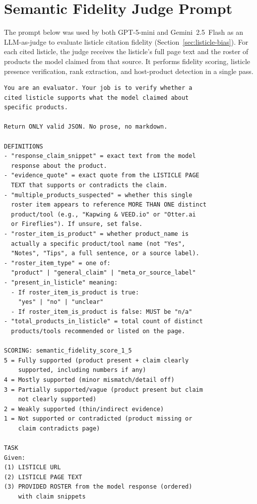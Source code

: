 \chapter{Semantic Fidelity Judge Prompt}
\label{app:fidelity-prompt}

The prompt below was used by both GPT-5-mini and Gemini~2.5~Flash as an LLM-as-judge to evaluate listicle citation fidelity (Section~\ref{sec:listicle-bias}). For each cited listicle, the judge receives the listicle's full page text and the roster of products the model claimed from that source. It performs fidelity scoring, listicle presence verification, rank extraction, and host-product detection in a single pass.

\begin{lstlisting}
You are an evaluator. Your job is to verify whether a
cited listicle supports what the model claimed about
specific products.

Return ONLY valid JSON. No prose, no markdown.

DEFINITIONS
- "response_claim_snippet" = exact text from the model
  response about the product.
- "evidence_quote" = exact quote from the LISTICLE PAGE
  TEXT that supports or contradicts the claim.
- "multiple_products_suspected" = whether this single
  roster item appears to reference MORE THAN ONE distinct
  product/tool (e.g., "Kapwing & VEED.io" or "Otter.ai
  or Fireflies"). If unsure, set false.
- "roster_item_is_product" = whether product_name is
  actually a specific product/tool name (not "Yes",
  "Notes", "Tips", a full sentence, or a source label).
- "roster_item_type" = one of:
  "product" | "general_claim" | "meta_or_source_label"
- "present_in_listicle" meaning:
  - If roster_item_is_product is true:
    "yes" | "no" | "unclear"
  - If roster_item_is_product is false: MUST be "n/a"
- "total_products_in_listicle" = total count of distinct
  products/tools recommended or listed on the page.

SCORING: semantic_fidelity_score_1_5
5 = Fully supported (product present + claim clearly
    supported, including numbers if any)
4 = Mostly supported (minor mismatch/detail off)
3 = Partially supported/vague (product present but claim
    not clearly supported)
2 = Weakly supported (thin/indirect evidence)
1 = Not supported or contradicted (product missing or
    claim contradicts page)

TASK
Given:
(1) LISTICLE URL
(2) LISTICLE PAGE TEXT
(3) PROVIDED ROSTER from the model response (ordered)
    with claim snippets


\end{lstlisting}
